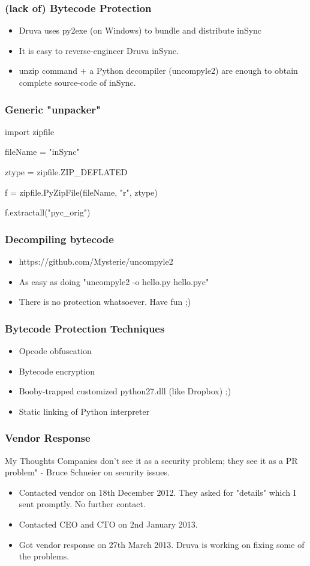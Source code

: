 \documentclass{beamer}
\begin{document}
\begin{frame}
	\frametitle{(lack of) Bytecode Protection}
	\begin{itemize}
		\item Druva uses py2exe (on Windows) to bundle and
		distribute inSync
		\item It is easy to reverse-engineer Druva inSync.
		\item unzip command + a Python decompiler (uncompyle2) are enough to obtain complete source-code of inSync.
	\end{itemize}
\end{frame}

\begin{frame}[fragile]
	\frametitle{Generic "unpacker"}
	\begin{python}
		import zipfile

		fileName = "inSync"

		ztype = zipfile.ZIP_DEFLATED

		f = zipfile.PyZipFile(fileName, "r", ztype)

		f.extractall("pyc_orig")
	\end{python}
\end{frame}

\begin{frame}
	\frametitle{Decompiling bytecode}
	\begin{itemize}
		\item https://github.com/Mysterie/uncompyle2
		\item As easy as doing "uncompyle2 -o hello.py hello.pyc"
		\item There is no protection whatsoever. Have fun ;)
	\end{itemize}
\end{frame}


\begin{frame}
	\frametitle{Bytecode Protection Techniques}
	\begin{itemize}
		\item Opcode obfuscation
		\item Bytecode encryption
		\item Booby-trapped customized python27.dll (like Dropbox) ;)
		\item Static linking of Python interpreter
	\end{itemize}
\end{frame}

\begin{frame}
	\frametitle{Vendor Response}
	\begin{block}{My Thoughts}
		Companies don't see it as a security problem;
		they see it as a PR problem" - Bruce Schneier on security issues.
	\end{block}
	\begin{itemize}
		\item Contacted vendor on 18th December 2012. They asked for
		      "details" which I sent promptly. No further contact.
		\item Contacted CEO and CTO on 2nd January 2013.
		\item Got vendor response on 27th March 2013. Druva is working
		      on fixing some of the problems.
	\end{itemize}
\end{frame}
\end{document}
